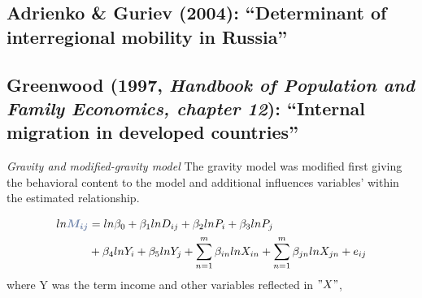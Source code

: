 \documentclass[11pt]{article}
\theoremstyle{prop}
\begin{document}
	\subsection{Adrienko \& Guriev (2004): ``Determinant of interregional mobility in Russia''}
	
	

	\subsection{Greenwood (1997, \textit{Handbook of Population and Family Economics, chapter 12}): ``Internal migration in developed countries''}
	
	\textit{Gravity and modified-gravity model} The gravity model was modified first giving the behavioral content to the model and additional influences variables' within the estimated relationship. 
	
	\begin{equation}
			\begin{split}	
			ln {\color{BlueG}\hm{M_{ij}}} &= ln\beta_0 + \beta_1lnD_{ij} +\beta_2 lnP_i +\beta_3 ln P_j \\		
			& +\beta_4 lnY_i + \beta_5 lnY_j +\sum_{n=1}^{m}\beta_{in}lnX_{in} +\sum_{n=1}^{m}\beta_{jn}lnX_{jn} + e_{ij}
			\end{split}
	\end{equation}
	where Y was the term income and other variables reflected in $"X"$, 
	
	
	
	
	

	
	
\end{document}
